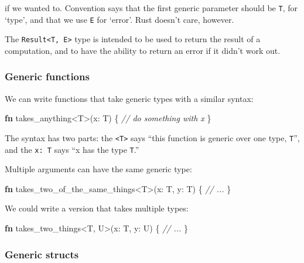 \documentclass[a4paper,]{book}
\newenvironment{Shaded}{\begin{snugshade}}{\end{snugshade}}
\newcommand{\KeywordTok}[1]{\textcolor[rgb]{0.13,0.29,0.53}{\textbf{{#1}}}}
\newcommand{\CommentTok}[1]{\textcolor[rgb]{0.56,0.35,0.01}{\textit{{#1}}}}
\newcommand{\NormalTok}[1]{{#1}}
\begin{document}
if we wanted to. Convention says that the first generic parameter should
be \texttt{T}, for `type', and that we use \texttt{E} for `error'. Rust
doesn't care, however.

The \texttt{Result\textless{}T,\ E\textgreater{}} type is intended to be
used to return the result of a computation, and to have the ability to
return an error if it didn't work out.

\subsubsection{Generic functions}\label{generic-functions}

We can write functions that take generic types with a similar syntax:

\begin{Shaded}
\begin{Highlighting}[]
\KeywordTok{fn} \NormalTok{takes_anything<T>(x: T) \{}
    \CommentTok{// do something with x}
\NormalTok{\}}
\end{Highlighting}
\end{Shaded}

The syntax has two parts: the \texttt{\textless{}T\textgreater{}} says
``this function is generic over one type, \texttt{T}'', and the
\texttt{x:\ T} says ``x has the type \texttt{T}.''

Multiple arguments can have the same generic type:

\begin{Shaded}
\begin{Highlighting}[]
\KeywordTok{fn} \NormalTok{takes_two_of_the_same_things<T>(x: T, y: T) \{}
    \CommentTok{// ...}
\NormalTok{\}}
\end{Highlighting}
\end{Shaded}

We could write a version that takes multiple types:

\begin{Shaded}
\begin{Highlighting}[]
\KeywordTok{fn} \NormalTok{takes_two_things<T, U>(x: T, y: U) \{}
    \CommentTok{// ...}
\NormalTok{\}}
\end{Highlighting}
\end{Shaded}

\subsubsection{Generic structs}\label{generic-structs}
\end{document}
